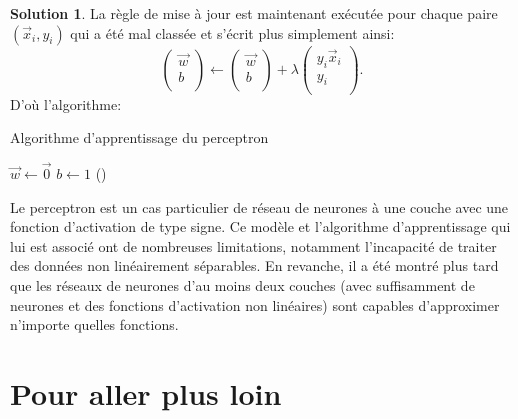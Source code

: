\documentclass[a4paper,francais]{article}
\theoremstyle{definition}
\newtheorem*{solution}{Solution}
\begin{document}
\begin{solution}
  La règle de mise à jour est maintenant exécutée pour chaque paire $(\vec{x}_i, y_i)$
  qui a été mal classée et s'écrit plus simplement ainsi: 
  \[
  \left(\begin{array}{c}
    \vec{w} \\
    b \\
  \end{array}
  \right)
  \leftarrow
  \left(\begin{array}{c}
    \vec{w} \\
    b \\
  \end{array}
  \right)
  +
  \lambda
  \left(\begin{array}{c}
    y_i\vec{x}_i \\
    y_i \\
  \end{array}
  \right).
  \]
  D'où l'algorithme:
  \begin{algorithm}[htbp]
    \caption{Algorithme d'apprentissage du perceptron}
    $\vec{w} \leftarrow \vec{0}$ \;
    $b \leftarrow 1$ \;
    ()
     \;
  \end{algorithm}
\end{solution}

Le perceptron est un cas particulier de réseau de neurones à une couche
avec une fonction d'activation de type signe. Ce modèle et l'algorithme
d'apprentissage qui lui est associé ont de nombreuses limitations,
notamment l'incapacité de traiter des données non linéairement
séparables. En revanche, il a été montré plus tard que les réseaux de
neurones d'au moins deux couches (avec suffisamment de neurones et des
fonctions d'activation non linéaires) sont capables d'approximer
n'importe quelles fonctions. 

\section{Pour aller plus loin}
\end{document}
